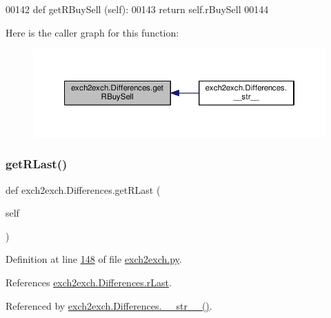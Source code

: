 \begin{DoxyCode}
00142     \textcolor{keyword}{def }getRBuySell (self):
00143         \textcolor{keywordflow}{return} self.rBuySell
00144         
\end{DoxyCode}
Here is the caller graph for this function\+:
\nopagebreak
\begin{figure}[H]
\begin{center}
\leavevmode
\includegraphics[width=350pt]{classexch2exch_1_1_differences_ae360dc9692075e21d0aafa2ff1dc23d4_icgraph}
\end{center}
\end{figure}
\mbox{\label{classexch2exch_1_1_differences_ac4f1f695ff394d65cfb51ea55dc67fa5}} 
\subsubsection{\texorpdfstring{get\+R\+Last()}{getRLast()}}
{\footnotesize\ttfamily def exch2exch.\+Differences.\+get\+R\+Last (\begin{DoxyParamCaption}\item[{}]{self }\end{DoxyParamCaption})}



Definition at line \hyperlink{exch2exch_8py_source_l00148}{148} of file \hyperlink{exch2exch_8py_source}{exch2exch.\+py}.



References \hyperlink{exch2exch_8py_source_l00125}{exch2exch.\+Differences.\+r\+Last}.



Referenced by \hyperlink{exch2exch_8py_source_l00154}{exch2exch.\+Differences.\+\_\+\+\_\+str\+\_\+\+\_\+()}.


